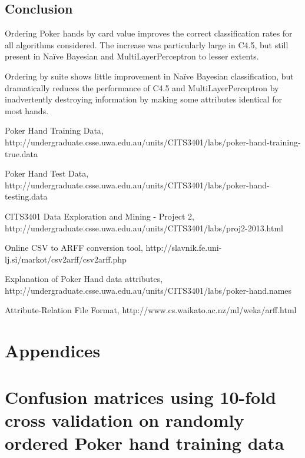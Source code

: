 \documentclass[10pt, a4paper]{article}
\begin{document}
\subsection*{Conclusion}

Ordering Poker hands by card value improves the correct classification rates for all algorithms considered. The increase was particularly large in C4.5, but still present in Na\"ive Bayesian and MultiLayerPerceptron to lesser extents. 

Ordering by suite shows little improvement in Na\"ive Bayesian classification, but dramatically reduces the performance of C4.5 and MultiLayerPerceptron by inadvertently destroying information by making some attributes identical for most hands. 

\begin{thebibliography}{9}

	Poker Hand Training Data,	
	http://undergraduate.csse.uwa.edu.au/units/CITS3401/labs/poker-hand-training-true.data
	
	Poker Hand Test Data,	
	http://undergraduate.csse.uwa.edu.au/units/CITS3401/labs/poker-hand-testing.data
	
	CITS3401 Data Exploration and Mining - Project 2,
	http://undergraduate.csse.uwa.edu.au/units/CITS3401/labs/proj2-2013.html

	Online CSV to ARFF conversion tool,
	http://slavnik.fe.uni-lj.si/markot/csv2arff/csv2arff.php

	Explanation of Poker Hand data attributes,
	http://undergraduate.csse.uwa.edu.au/units/CITS3401/labs/poker-hand.names

	Attribute-Relation File Format,
	http://www.cs.waikato.ac.nz/ml/weka/arff.html

\end{thebibliography}



\clearpage

\appendix

\section*{Appendices}

\section{Confusion matrices using 10-fold cross validation on randomly ordered Poker hand training data}
\end{document}
